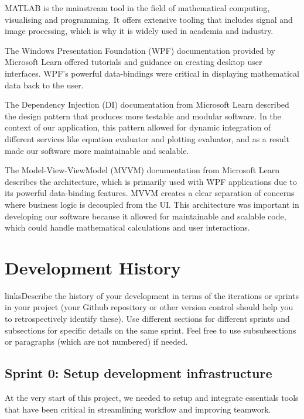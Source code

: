 \documentclass[a4paper, oneside, 11pt]{report}
\begin{document}
MATLAB\cite{Matlab:2023} is the mainstream tool in the field of mathematical computing, visualising and programming. It offers extensive tooling that includes signal and image processing, which is why it is widely used in academia and industry.

The Windows Presentation Foundation (WPF)\cite{WPF:2023} documentation provided by Microsoft Learn offered tutorials and guidance on creating desktop user interfaces. WPF’s powerful data-bindings were critical in displaying mathematical data back to the user.

The Dependency Injection (DI) \cite{DI:2023} documentation from Microsoft Learn described the design pattern that produces more testable and modular software. In the context of our application, this pattern allowed for dynamic integration of different services like equation evaluator and plotting evaluator, and as a result made our software more maintainable and scalable.

The Model-View-ViewModel (MVVM)\cite{MVVM:2022} documentation from Microsoft Learn describes the architecture, which is primarily used with WPF applications due to its powerful data-binding features. MVVM creates a clear separation of concerns where business logic is decoupled from the UI. This architecture was important in developing our software because it allowed for maintainable and scalable code, which could handle mathematical calculations and user interactions.


\chapter{Development History}\label{Chap:DevHist}

linksDescribe the history of your development in terms of the iterations or sprints in your project (your Github repository or other version control should help you to retrospectively identify these). Use different sections for different sprints and subsections for specific details on the same sprint. Feel free to use subsubsections or paragraphs (which are not numbered) if needed. 

\section{Sprint 0: Setup development infrastructure}
At the very start of this project, we needed to setup and integrate essentials tools that have been critical in streamlining workflow and improving teamwork.
\end{document}
